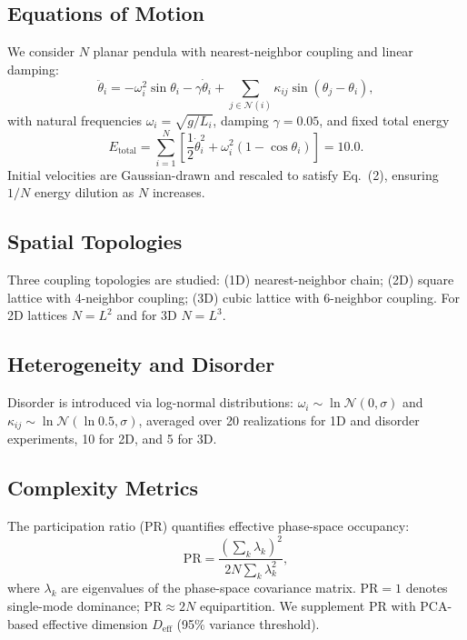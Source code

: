 \documentclass[aps,pre,12pt]{revtex4-2}
\begin{document}
\subsection{Equations of Motion}
We consider $N$ planar pendula with nearest-neighbor coupling and linear damping:
\begin{equation}
    \ddot{\theta}_i = -\omega_i^2 \sin\theta_i - \gamma \dot{\theta}_i + \sum_{j \in \mathcal{N}(i)} \kappa_{ij} \sin(\theta_j - \theta_i),
\end{equation}
with natural frequencies $\omega_i = \sqrt{g/L_i}$, damping $\gamma = 0.05$, and fixed total energy
\begin{equation}
    E_{\text{total}} = \sum_{i=1}^N \left[ \frac{1}{2} \dot{\theta}_i^2 + \omega_i^2 (1 - \cos\theta_i) \right] = 10.0.
\end{equation}
Initial velocities are Gaussian-drawn and rescaled to satisfy Eq.~(2), ensuring $1/N$ energy dilution as $N$ increases.

\subsection{Spatial Topologies}
Three coupling topologies are studied: (1D) nearest-neighbor chain; (2D) square lattice with 4-neighbor coupling; (3D) cubic lattice with 6-neighbor coupling. For 2D lattices $N = L^2$ and for 3D $N = L^3$.

\subsection{Heterogeneity and Disorder}
Disorder is introduced via log-normal distributions: $\omega_i \sim \ln\mathcal{N}(0, \sigma)$ and $\kappa_{ij} \sim \ln\mathcal{N}(\ln 0.5, \sigma)$, averaged over 20 realizations for 1D and disorder experiments, 10 for 2D, and 5 for 3D.

\subsection{Complexity Metrics}
The participation ratio (PR) quantifies effective phase-space occupancy:
\begin{equation}
    \text{PR} = \frac{\left(\sum_k \lambda_k\right)^2}{2N \sum_k \lambda_k^2},
\end{equation}
where $\lambda_k$ are eigenvalues of the phase-space covariance matrix. $\text{PR} = 1$ denotes single-mode dominance; $\text{PR} \approx 2N$ equipartition. We supplement PR with PCA-based effective dimension $D_{\text{eff}}$ (95\% variance threshold).
\end{document}
